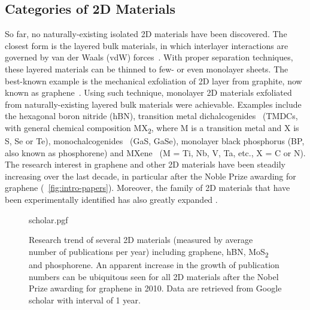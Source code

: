 

\subsection{Categories of 2D Materials}
\label{sec:categ-2d-mater}

So far, no naturally-existing isolated 2D
materials have been discovered.
%
The closest form is the layered bulk materials, in which interlayer
interactions are governed by van der Waals (vdW)
forces~.
%
With proper separation techniques, these layered materials can be
thinned to few- or even mono\-layer sheets.
%
The best-known example is the mechanical exfoliation of 2D layer from graphite,
now known as graphene~\cite{Novoselov_2004_gr}.
%
Using such technique, mono\-layer 2D materials exfoliated from naturally-existing
layered bulk materials were achievable.
%
Examples include the hexagonal boron
nitride\cite{Cavar_2008_hBN_Pt,Gorbachev_2011} (hBN), transition metal
dichalcogenides~\cite{Mak_2010_mos2} (TMDCs, with general chemical
composition MX\textsubscript{2}, where M is a transition metal and X
is S, Se or Te), monochalcogenides~\cite{Late_2012_GaS} (GaS, GaSe),
monolayer black phosphorus\cite{Li_2014_BP,Liu_2014_BP} (BP, also
known as phosphorene) and MXene~\cite{Naguib_2011_Mxene} (M = Ti, Nb,
V, Ta, etc., X = C or N).
%
The research interest in graphene and other 2D materials have been
steadily increasing over the last decade, in particular after the
Noble Prize awarding for graphene (~\autoref{fig:intro-papers}).
%
Moreover, the family of 2D materials that have been experimentally
identified has also greatly expanded
\cite{Bhimanapati_2015_2D_rev,Mannix_2017}.

\begin{figure}[htbp]
  \centering
  {scholar.pgf}
  \caption{\label{fig:intro-papers} %
    Research trend of several 2D materials (measured by average number
    of publications per year) including graphene, hBN,
    MoS\textsubscript{2} and phosphorene.  An apparent increase in the
    growth of publication numbers can be ubiquitous seen for all 2D
    materials after the Nobel Prize awarding for graphene in 2010.
    Data are retrieved from Google scholar with interval of 1
    year. }
\end{figure}

